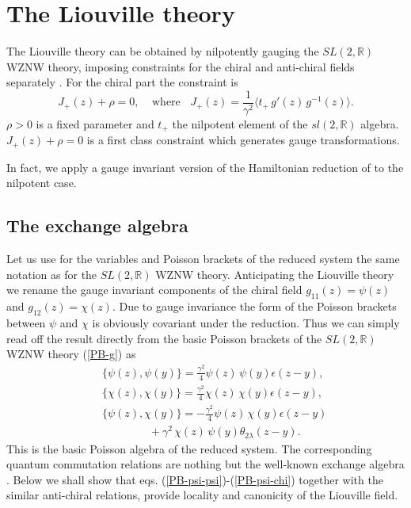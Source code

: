 \documentclass[a4paper,12pt]{article}
\newcommand{\rr}{\mathbb{R}}
\begin{document}
\setcounter{equation}{0}

\section {The Liouville theory}

The Liouville theory can be obtained by nilpotently gauging the
$SL(2,\rr)$ WZNW theory, imposing constraints for the chiral and
anti-chiral fields separately \cite{Balog}.   For the chiral part the
constraint is
\begin{equation}\label{constraint}
J_+(z)+\rho =0,~~~~~\mbox{where}~~~~
J_+(z)=\frac{1}{\gamma^2}\langle t_+\, g'(z)\, g^{-1}(z)\rangle.
\end{equation}
$\rho > 0$ is a fixed parameter and $t_+$ the nilpotent element
of the $sl(2,\rr)$ algebra. $J_+(z)+\rho=0$ is a first class constraint
which generates gauge transformations.

\noindent
In fact, we  apply a gauge invariant version
of the Hamiltonian reduction of \cite{FJW}
to the nilpotent case.

\subsection{The exchange algebra}

\noindent
Let us use for the variables and Poisson brackets of the
reduced system the same notation as for the $SL(2,\rr)$ WZNW theory.
Anticipating the Liouville theory we rename the gauge invariant
components of the chiral field $g_{11}(z)=\psi(z)$ and
$g_{12}(z)=\chi(z)$. Due to  gauge invariance
the form of the Poisson brackets
between $\psi$ and $\chi$ is obviously covariant under the
reduction.  Thus we can simply read off the result directly
from the basic Poisson brackets of the $SL(2,\rr)$ WZNW theory
(\ref{PB-g}) as
\begin{eqnarray}\label{PB-psi-psi}
&&\{\psi (z),\psi(y)\}=\frac{\gamma^2}{4}\psi (z)\,\psi(y)\epsilon(z-y),
\\
\label{PB-chi_1-chi_1}
&&\{\chi(z),\chi(y)\}=\frac{\gamma^2}{4}\chi(z)\,
\chi(y)\epsilon(z-y),\\
\label{PB-psi-chi}
&&\{\psi (z),\chi(y)\}=
-\frac{\gamma^2}{4}\psi (z)\,\chi(y)\epsilon(z-y)\\
 \nonumber
&&~~~~~~~~~~~~~~~~~~~
+{\gamma^2}\,\chi (z)\,\psi(y)\theta_{2\lambda}(z-y).
\end{eqnarray}
This is the basic Poisson algebra of the reduced
system. The corresponding quantum commutation relations are
nothing but the well-known exchange algebra \cite{Neveu}.
Below we shall show that eqs. (\ref{PB-psi-psi})-(\ref{PB-psi-chi})
together with the similar
anti-chiral relations, provide locality and canonicity
of the Liouville field.
\end{document}
